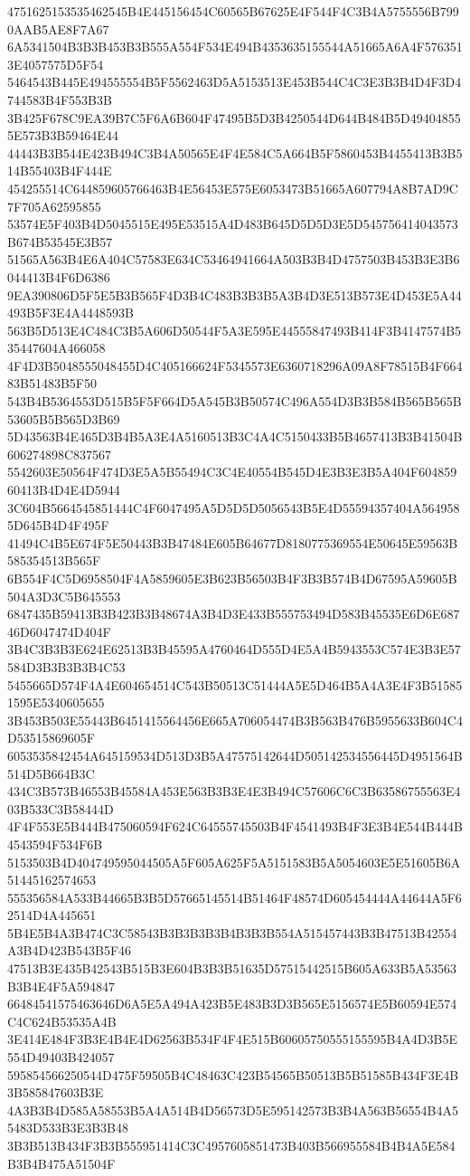 {{{{{{{{{{{{{{{{{{{{{4751625153535462545B4E445156454C60565B67625E4F544F4C3B4A5755556B7990AAB5AE8F7A67
6A5341504B3B3B453B3B555A554F534E494B4353635155544A51665A6A4F5763513E4057575D5F54
5464543B445E494555554B5F5562463D5A5153513E453B544C4C3E3B3B4D4F3D4744583B4F553B3B
3B425F678C9EA39B7C5F6A6B604F47495B5D3B4250544D644B484B5D494048555E573B3B59464E44
44443B3B544E423B494C3B4A50565E4F4E584C5A664B5F5860453B4455413B3B514B55403B4F444E
454255514C644859605766463B4E56453E575E6053473B51665A607794A8B7AD9C7F705A62595855
53574E5F403B4D5045515E495E53515A4D483B645D5D5D3E5D545756414043573B674B53545E3B57
51565A563B4E6A404C57583E634C53464941664A503B3B4D4757503B453B3E3B6044413B4F6D6386
9EA390806D5F5E5B3B565F4D3B4C483B3B3B5A3B4D3E513B573E4D453E5A44493B5F3E4A4448593B
563B5D513E4C484C3B5A606D50544F5A3E595E44555847493B414F3B4147574B535447604A466058
4F4D3B5048555048455D4C405166624F5345573E6360718296A09A8F78515B4F66483B51483B5F50
543B4B5364553D515B5F5F664D5A545B3B50574C496A554D3B3B584B565B565B53605B5B565D3B69
5D43563B4E465D3B4B5A3E4A5160513B3C4A4C5150433B5B4657413B3B41504B606274898C837567
5542603E50564F474D3E5A5B55494C3C4E40554B545D4E3B3E3B5A404F60485960413B4D4E4D5944
3C604B5664545851444C4F6047495A5D5D5D5056543B5E4D55594357404A5649585D645B4D4F495F
41494C4B5E674F5E50443B3B47484E605B64677D8180775369554E50645E59563B585354513B565F
6B554F4C5D6958504F4A5859605E3B623B56503B4F3B3B574B4D67595A59605B504A3D3C5B645553
6847435B59413B3B423B3B48674A3B4D3E433B555753494D583B45535E6D6E68746D6047474D404F
3B4C3B3B3E624E62513B3B45595A4760464D555D4E5A4B5943553C574E3B3E57584D3B3B3B3B4C53
5455665D574F4A4E604654514C543B50513C51444A5E5D464B5A4A3E4F3B515851595E5340605655
3B453B503E55443B6451415564456E665A706054474B3B563B476B5955633B604C4D53515869605F
6053535842454A645159534D513D3B5A47575142644D505142534556445D4951564B514D5B664B3C
434C3B573B46553B45584A453E563B3B3E4E3B494C57606C6C3B63586755563E403B533C3B58444D
4F4F553E5B444B475060594F624C64555745503B4F4541493B4F3E3B4E544B444B4543594F534F6B
5153503B4D404749595044505A5F605A625F5A5151583B5A5054603E5E51605B6A51445162574653
555356584A533B44665B3B5D57665145514B51464F48574D605454444A44644A5F62514D4A445651
5B4E5B4A3B474C3C58543B3B3B3B3B4B3B3B554A515457443B3B47513B42554A3B4D423B543B5F46
47513B3E435B42543B515B3E604B3B3B51635D57515442515B605A633B5A53563B3B4E4F5A594847
66484541575463646D6A5E5A494A423B5E483B3D3B565E5156574E5B60594E574C4C624B53535A4B
3E414E484F3B3E4B4E4D62563B534F4F4E515B60605750555155595B4A4D3B5E554D49403B424057
595854566250544D475F59505B4C48463C423B54565B50513B5B51585B434F3E4B3B585847603B3E
4A3B3B4D585A58553B5A4A514B4D56573D5E595142573B3B4A563B56554B4A55483D533B3E3B3B48
3B3B513B434F3B3B555951414C3C4957605851473B403B566955584B4B4A5E584B3B4B475A51504F
}}}}}}}}}}}}}}}}}}}}}
